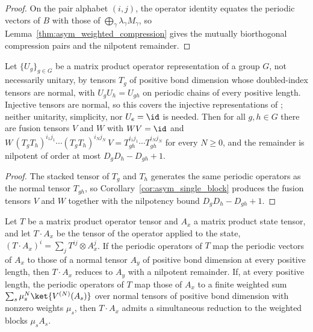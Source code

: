 \begin{proof}
    \leanok
    On the pair alphabet $(i,j)$, the operator identity equates the periodic
    vectors of $B$ with those of $\bigoplus_\gamma \lambda_\gamma M_\gamma$,
    so Lemma~\ref{thm:asym_weighted_compression} gives the mutually
    biorthogonal compression pairs and the nilpotent remainder.
\end{proof}

\begin{corollary}
    \label{cor:asym_fusion_tensors_group}
    \leanok
    Let $\{U_g\}_{g\in G}$ be a matrix product operator representation of
    a group $G$, not necessarily unitary, by tensors $T_g$ of positive bond
    dimension whose doubled-index tensors are normal, with $U_gU_h=U_{gh}$
    on periodic chains of every positive length. Injective tensors are
    normal, so this covers the injective representations of
    \cite{GarreRubio2023MPOSym}; neither unitarity, simplicity, nor
    $U_e=\id$ is needed. Then for all $g,h\in G$
    there are fusion tensors $V$ and $W$ with $WV=\id$ and
    $W\,(T_gT_h)^{i_1j_1}\cdots(T_gT_h)^{i_Nj_N}\,V
        =T_{gh}^{i_1j_1}\cdots T_{gh}^{i_Nj_N}$
    for every $N\geq0$, and the remainder is nilpotent of order at most
    $D_gD_h-D_{gh}+1$.
\end{corollary}

\begin{proof}
    \leanok
    The stacked tensor of $T_g$ and $T_h$ generates the same periodic
    operators as the normal tensor $T_{gh}$, so
    Corollary~\ref{cor:asym_single_block} produces the fusion tensors $V$
    and $W$ together with the nilpotency bound $D_gD_h-D_{gh}+1$.
\end{proof}

\begin{corollary}
    \label{cor:asym_action_tensors}
    \leanok
    Let $T$ be a matrix product operator tensor and $A_x$ a matrix product
    state tensor, and let $T\cdot A_x$ be the tensor of the operator applied
    to the state, $(T\cdot A_x)^i=\sum_jT^{ij}\otimes A_x^j$. If the periodic
    operators of $T$ map the periodic vectors of $A_x$ to those of a normal
    tensor $A_y$ of positive bond dimension at every positive length, then
    $T\cdot A_x$ reduces to $A_y$ with a nilpotent remainder. If, at every
    positive length, the periodic operators of $T$ map those of $A_x$ to a
    finite weighted sum $\sum_s\mu_s^N\ket{V^{(N)}(A_s)}$ over normal tensors
    of positive bond dimension with nonzero weights $\mu_s$, then $T\cdot A_x$
    admits a simultaneous reduction to the weighted blocks $\mu_sA_s$.
\end{corollary}

